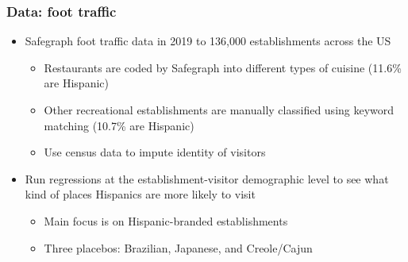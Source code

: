 \documentclass{beamer}
\begin{document}
\begin{frame} 
\frametitle{Data: foot traffic} \label{safegraph_data}
\begin{itemize}
\item Safegraph foot traffic data in 2019 to 136,000 establishments across the US
\begin{itemize}
\item Restaurants are coded by Safegraph into different types of cuisine (11.6\% are Hispanic)
\item Other recreational establishments are manually classified using keyword matching (10.7\% are Hispanic)
\item Use census data to impute identity of visitors
\end{itemize}
\item Run regressions at the establishment-visitor demographic level to see what kind of places Hispanics are more likely to visit
\begin{itemize}
\item Main focus is on Hispanic-branded establishments
\item Three placebos: Brazilian, Japanese, and Creole/Cajun
\end{itemize}
\end{itemize}
\end{frame}
\end{document}
